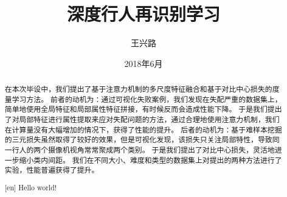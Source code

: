 \documentclass[fangfont=AdobeFangsongStd-Regular,heifont=AdobeHeitiStd-Regular,blind]{zju-thesis}
\title{深度行人再识别学习}{浙江大学本科生毕业论文}
\author{王兴路}{3140102282}
\date{2018年6月}
\begin{document}

\begin{abstract}
	在本次毕设中，我们提出了基于注意力机制的多尺度特征融合和基于对比中心损失的度量学习方法。
前者的动机为：通过可视化失败案例，我们发现在失配严重的数据集上，简单地使用全局特征和局部属性特征拼接，有时候反而会造成性能下降。
于是我们提出了对局部特征进行属性提取来应对失配问题的方法，通过合理地使用注意力机制，我们在计算量没有大幅增加的情况下，获得了性能的提升。
后者的动机为：基于难样本挖掘的三元损失虽然取得了较好的效果，但是可视化发现，该损失只关注局部特性，导致同一行人的两个摄像机视角常常聚成两个类别。
于是我们提出了对比中心损失，灵活地进一步缩小类内间距。
我们在不同大小、难度和类型的数据集上对提出的两种方法进行了实验，性能普遍获得了提升。

	
	\keywords{}
	\end{abstract}
\begin{abstract}[en]
	Hello world!
	
\end{abstract}
	

\tableofcontents
\begin{refsection}

	
\end{refsection}
% 
% 
% 
\end{document}

